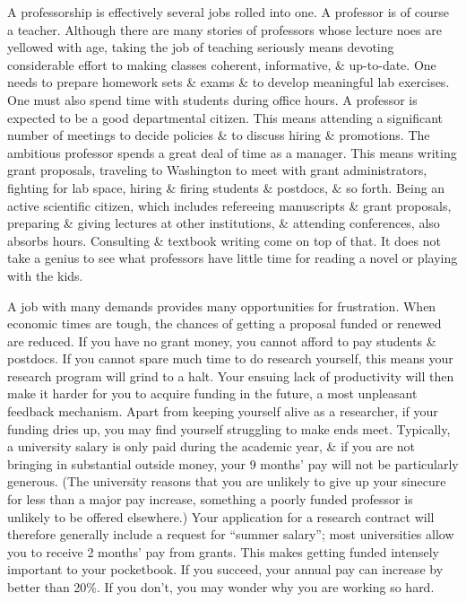 \documentclass{article}
\begin{document}
\begin{enumerate}
\begin{itemize}
\begin{itemize}
			A professorship is effectively several jobs rolled into one. A professor is of course a teacher. Although there are many stories of professors whose lecture noes are yellowed with age, taking the job of teaching seriously means devoting considerable effort to making classes coherent, informative, \& up-to-date. One needs to prepare homework sets \& exams \& to develop meaningful lab exercises. One must also spend time with students during office hours. A professor is expected to be a good departmental citizen. This means attending a significant number of meetings to decide policies \& to discuss hiring \& promotions. The ambitious professor spends a great deal of time as a manager. This means writing grant proposals, traveling to Washington to meet with grant administrators, fighting for lab space, hiring \& firing students \& postdocs, \& so forth. Being an active scientific citizen, which includes refereeing manuscripts \& grant proposals, preparing \& giving lectures at other institutions, \& attending conferences, also absorbs hours. Consulting \& textbook writing come on top of that. It does not take a genius to see what professors have little time for reading a novel or playing with the kids.
			
			A job with many demands provides many opportunities for frustration. When economic times are tough, the chances of getting a proposal funded or renewed are reduced. If you have no grant money, you cannot afford to pay students \& postdocs. If you cannot spare much time to do research yourself, this means your research program will grind to a halt. Your ensuing lack of productivity will then make it harder for you to acquire funding in the future, a most unpleasant feedback mechanism. Apart from keeping yourself alive as a researcher, if your funding dries up, you may find yourself struggling to make ends meet. Typically, a university salary is only paid during the academic year, \& if you are not bringing in substantial outside money, your 9 months' pay will not be particularly generous. (The university reasons that you are unlikely to give up your sinecure for less than a major pay increase, something a poorly funded professor is unlikely to be offered elsewhere.) Your application for a research contract will therefore generally include a request for ``summer salary''; most universities allow you to receive 2 months' pay from grants. This makes getting funded intensely important to your pocketbook. If you succeed, your annual pay can increase by better than 20\%. If you don't, you may wonder why you are working so hard.
			

\end{itemize}
\end{itemize}
\end{enumerate}
\end{document}
